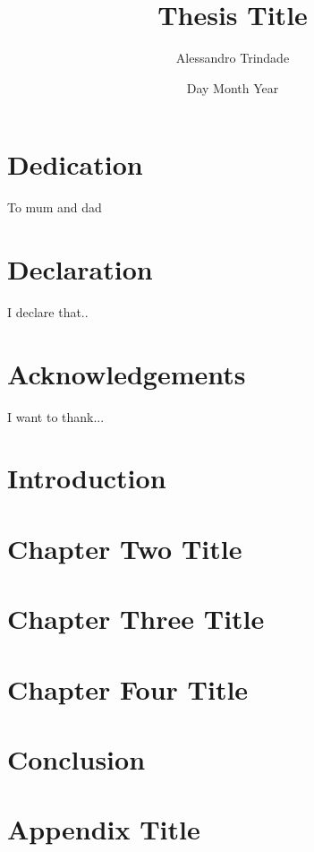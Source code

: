 \documentclass[12pt,twoside]{report}
\title{Thesis Title}
\author{Alessandro Trindade}
\date{Day Month Year}
\begin{document}




\chapter*{Dedication}
To mum and dad

\chapter*{Declaration}
I declare that..

\chapter*{Acknowledgements}
I want to thank...

\tableofcontents

\listoffigures

\listoftables

\chapter{Introduction}


\chapter{Chapter Two Title}


\chapter{Chapter Three Title}


\chapter{Chapter Four Title}


\chapter{Conclusion}


\appendix
\chapter{Appendix Title}


{}
\end{document}
